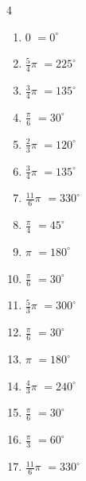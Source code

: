 \begin{multicols}{4}
\begin{enumerate}
  \item $\displaystyle 0$
        $\displaystyle =0^{\circ}$

  \item $\displaystyle \frac{5}{4}\pi$
        $\displaystyle =225^{\circ}$

  \item $\displaystyle \frac{3}{4}\pi$
        $\displaystyle =135^{\circ}$

  \item $\displaystyle \frac{\pi}{6}$
        $\displaystyle =30^{\circ}$

  \item $\displaystyle \frac{2}{3}\pi$
        $\displaystyle =120^{\circ}$

  \item $\displaystyle \frac{3}{4}\pi$
        $\displaystyle =135^{\circ}$

  \item $\displaystyle \frac{11}{6}\pi$
        $\displaystyle =330^{\circ}$

  \item $\displaystyle \frac{\pi}{4}$
        $\displaystyle =45^{\circ}$

  \item $\displaystyle \pi$
        $\displaystyle =180^{\circ}$

  \item $\displaystyle \frac{\pi}{6}$
        $\displaystyle =30^{\circ}$

  \item $\displaystyle \frac{5}{3}\pi$
        $\displaystyle =300^{\circ}$

  \item $\displaystyle \frac{\pi}{6}$
        $\displaystyle =30^{\circ}$

  \item $\displaystyle \pi$
        $\displaystyle =180^{\circ}$

  \item $\displaystyle \frac{4}{3}\pi$
        $\displaystyle =240^{\circ}$

  \item $\displaystyle \frac{\pi}{6}$
        $\displaystyle =30^{\circ}$

  \item $\displaystyle \frac{\pi}{3}$
        $\displaystyle =60^{\circ}$

  \item $\displaystyle \frac{11}{6}\pi$
        $\displaystyle =330^{\circ}$


\end{enumerate}
\end{multicols}
